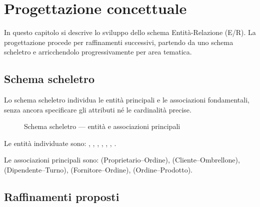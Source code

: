 \chapter{Progettazione concettuale}

In questo capitolo si descrive lo sviluppo dello schema Entit\`{a}-Relazione (E/R).
La progettazione procede per raffinamenti successivi, partendo da uno schema scheletro
e arricchendolo progressivamente per area tematica.

\section{Schema scheletro}

Lo schema scheletro individua le entit\`{a} principali e le associazioni fondamentali,
senza ancora specificare gli attributi n\'e le cardinalit\`{a} precise.

\begin{figure}[H]
  \centering
  \caption{Schema scheletro --- entit\`{a} e associazioni principali}
  \label{fig:schema-scheletro}
\end{figure}

Le entit\`{a} individuate sono: , ,
, , ,
, .

Le associazioni principali sono:  (Proprietario--Ordine),
 (Cliente--Ombrellone),  (Dipendente--Turno),
 (Fornitore--Ordine),  (Ordine--Prodotto).

\section{Raffinamenti proposti}

